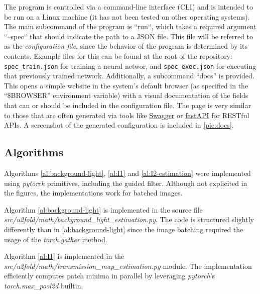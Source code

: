 \documentclass[twocolumn,twoside,a4paper,10pt]{IEEEtran}
\begin{document}
The program is controlled via a command-line interface (CLI) and is intended to be run on a Linux machine (it has not been tested on other operating systems). The main subcommand of the program is ``run``, which takes a required argument ``--spec`` that should indicate the path to a JSON file. This file will be referred to as the \textit{configuration file}, since the behavior of the program
is determined by its contents. Example files for this can be found at the root of the repository: \verb|spec_train.json| for training a neural networ, and \verb|spec_exec.json| for executing that previously trained network. Additionally, a subcommand ``docs'' is provided. This opens a simple website in
the system's default browser (as specified in the ``\$BROWSER'' environment variable) with a visual documentation of the fields that can or should be included in the configuration file. The page is very similar to those that are
often generated via tools like \href{https://editor.swagger.io/}{Swagger} or \href{https://fastapi.tiangolo.com/}{fastAPI} for RESTful APIs. A screenshot of the generated configuration is included in \cref{pic:docs}.

\subsection{Algorithms}
Algorithms \ref{al:background-light}, \ref{al:I1} and \ref{al:I2-estimation} were implemented using \textit{pytorch} primitives, including the guided filter.
Although not explicited in the figures, the implementations work for batched images.

Algorithm \ref{al:background-light} is implemented in the source file \textit{src/u2fold/math/background\_light\_estimation.py}. The code is structured slightly differently than in \ref{al:background-light} since the image batching required the usage of the \textit{torch.gather} method.

Algorithm \ref{al:I1} is implemented in the \textit{src/u2fold/math/transmission\_map\_estimation.py} module. The implementation efficiently computes patch minima in parallel by leveraging \textit{pytorch}'s \textit{torch.max\_pool2d} builtin.
\end{document}
